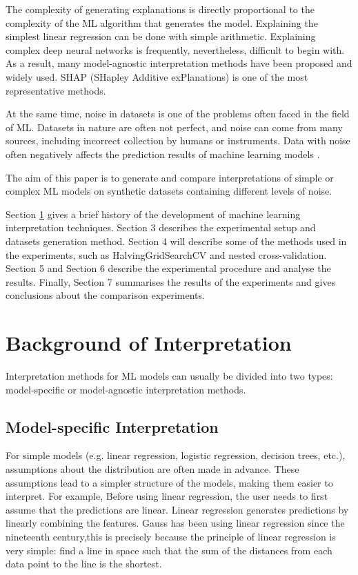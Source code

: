 \documentclass[runningheads,a4paper]{llncs}
\begin{document}
The complexity of generating explanations is directly proportional to the complexity of the ML algorithm that generates the model.
Explaining the simplest linear regression can be done with simple arithmetic. Explaining complex deep neural networks is frequently, nevertheless, difficult to begin with.
As a result, many model-agnostic interpretation methods have been proposed and widely used.
SHAP (SHapley Additive exPlanations)\cite{lundberg2017unified} is one of the most representative methods.

At the same time, noise in datasets is one of the problems often faced in the field of ML.
Datasets in nature are often not perfect, and noise can come from many sources, including incorrect collection by humans or instruments.
Data with noise often negatively affects the prediction results of machine learning models \cite{GUPTA2019466}\cite{saseendran2019impact}.

The aim of this paper is to generate and compare interpretations of simple or complex ML models on synthetic datasets containing different levels of noise.

Section \ref{section background} gives a brief history of the development of machine learning interpretation techniques. 
Section 3 describes the experimental setup and datasets generation method. 
Section 4 will describe some of the methods used in the experiments, such as HalvingGridSearchCV and nested cross-validation.
Section 5 and Section 6 describe the experimental procedure and analyse the results. 
Finally, Section 7 summarises the results of the experiments and gives conclusions about the comparison experiments.

\section{Background of Interpretation}\label{section background}

Interpretation methods for ML models can usually be divided into two types: model-specific or model-agnostic interpretation methods\cite{doshivelez2017rigorous}.

\subsection{Model-specific Interpretation}

For simple models (e.g. linear regression, logistic regression, decision trees, etc.), assumptions about the distribution  are often made in advance\cite{doshivelez2017rigorous}.
These assumptions lead to a simpler structure of the models, making them easier to interpret.
For example, Before using linear regression, the user needs to first assume that the predictions are linear.
Linear regression generates predictions by linearly combining the features.
Gauss has been using linear regression since the nineteenth century\cite{gauss1877theoria},this is precisely because the principle of linear regression is very simple: find a line in space such that the sum of the distances from each data point to the line is the shortest.
\end{document}
